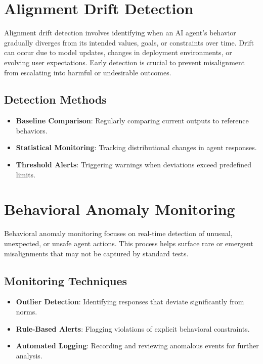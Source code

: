 
\begin{TNtwocol}

\section{Alignment Drift Detection}
Alignment drift detection involves identifying when an AI agent’s behavior gradually diverges from its intended values, goals, or constraints over time. Drift can occur due to model updates, changes in deployment environments, or evolving user expectations. Early detection is crucial to prevent misalignment from escalating into harmful or undesirable outcomes.

\subsection{Detection Methods}
\begin{itemize}
    \item \textbf{Baseline Comparison}: Regularly comparing current outputs to reference behaviors.
    \item \textbf{Statistical Monitoring}: Tracking distributional changes in agent responses.
    \item \textbf{Threshold Alerts}: Triggering warnings when deviations exceed predefined limits.
\end{itemize}

\section{Behavioral Anomaly Monitoring}
Behavioral anomaly monitoring focuses on real-time detection of unusual, unexpected, or unsafe agent actions. This process helps surface rare or emergent misalignments that may not be captured by standard tests.

\subsection{Monitoring Techniques}
\begin{itemize}
    \item \textbf{Outlier Detection}: Identifying responses that deviate significantly from norms.
    \item \textbf{Rule-Based Alerts}: Flagging violations of explicit behavioral constraints.
    \item \textbf{Automated Logging}: Recording and reviewing anomalous events for further analysis.
\end{itemize}


\end{TNtwocol}
